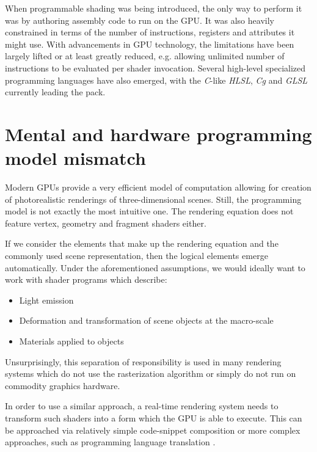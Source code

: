 When programmable shading was being introduced, the only way to perform it was by authoring assembly code to run on the GPU. It was also heavily constrained in terms of the number of instructions, registers and attributes it might use. With advancements in GPU technology, the limitations have been largely lifted or at least greatly reduced, e.g. allowing unlimited number of instructions to be evaluated per shader invocation. Several high-level specialized programming languages have also emerged, with the \emph{C}-like \emph{HLSL}, \emph{Cg} and \emph{GLSL} currently leading the pack.


\section{Mental and hardware programming model mismatch}

Modern GPUs provide a very efficient model of computation allowing for creation of photorealistic renderings of three-dimensional scenes. Still, the programming model is not exactly the most intuitive one. The rendering equation does not feature vertex, geometry and fragment shaders either.

If we consider the elements that make up the rendering equation and the commonly used scene representation, then the logical elements emerge automatically. Under the aforementioned assumptions, we would ideally want to work with shader programs which describe:
\begin{itemize}
\item Light emission
\item Deformation and transformation of scene objects at the macro-scale
\item Materials applied to objects
\end{itemize}

Unsurprisingly, this separation of responsibility is used in many rendering systems which do not use the rasterization algorithm or simply do not run on commodity graphics hardware.

In order to use a similar approach, a real-time rendering system needs to transform such shaders into a form which the GPU is able to execute. This can be approached via relatively simple code-snippet composition \cite{Hargreaves04} or more complex approaches, such as programming language translation \cite{mentalMillMetaSL}.
